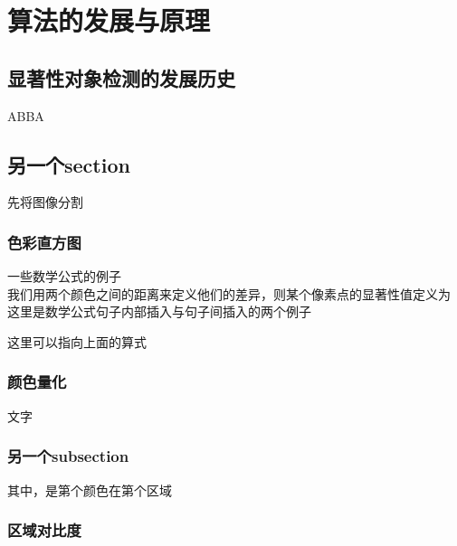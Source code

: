 \chapter{算法的发展与原理}

\section{显著性对象检测的发展历史}

ABBA\cite{730558}
\section{另一个section}

先将图像分割 \cite{Felzenszwalb:2004:EGI:981793.981796}

\subsection{色彩直方图}

一些数学公式的例子\\

我们用两个颜色之间的距离来定义他们的差异，则某个像素点的显著性值定义为
这里是数学公式句子内部插入与句子间插入的两个例子


这里可以指向上面的算式


\subsection{颜色量化}

文字

\subsection{另一个subsection}

其中，是第个颜色在第个区域


\subsection{区域对比度}


